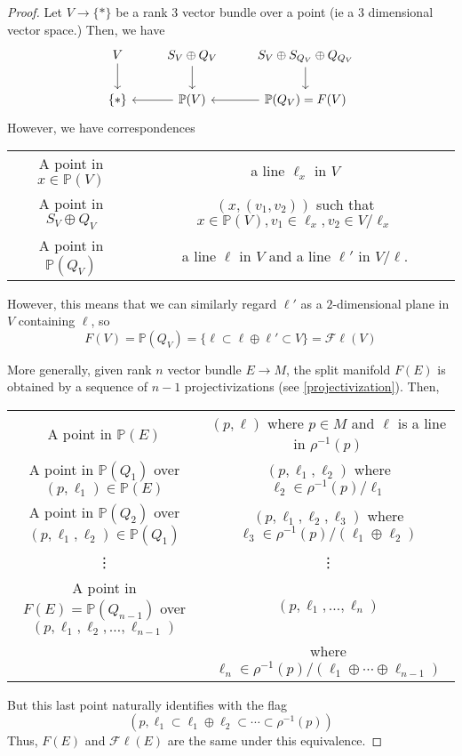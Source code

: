 \documentclass[11pt,leqno,oneside]{amsbook}
\renewcommand{\P}{\mathbb{P}}
\numberwithin{thm}{section}
\newcommand{\Fl}{\mathcal{F\ell}}
\begin{document}
\begin{proof}
  Let \(V \to \{*\}\) be a rank \(3\) vector bundle over a point (ie a
  \(3\) dimensional vector space.) Then, we have \[
    \begin{tikzcd}
      V \ar[d]& S_V \oplus Q_V \ar[d]& S_V \oplus S_{Q_V} \oplus Q_{Q_V} \ar[d]\\
      \{*\} &\ar[l] \P(V) & \ar[l] \P(Q_V) = F(V)
    \end{tikzcd}
  \]
  However, we have correspondences
  \begin{center}
    \begin{tabular}{c|c}
      A point in \(x \in \P(V)\)&  a line \(\ell_x\) in \(V\)\\
      A point in \(S_V \oplus Q_V\) & \((x,(v_1,v_2))\) such that \(
      x \in \P(V), v_1 \in \ell_x, v_2 \in V / \ell_x\) \\
      A point in \(\P(Q_V)\)& a line \(\ell\) in \(V\)
      and a line \(\ell'\) in \(V/\ell\).
    \end{tabular}
  \end{center}
  However, this means that we can similarly regard \(\ell'\) as a
  \(2\)-dimensional plane in \(V\) containing \(\ell\), so \[
    F(V) = \P(Q_V) = \{\ell \subset \ell \oplus \ell' \subset V\} = \Fl(V)
  \]

  More generally, given rank \(n\) vector bundle \(E \to M\), the
  split manifold \(F(E)\) is obtained by a sequence of \(n-1\)
  projectivizations (see \ref{projectivization}). Then,\\
  \begin{center}
    \noindent\begin{tabular}{@{}c|c}
      A point in \(\P(E)\)
      & \((p,\ell)\) where \(p \in M\) and
        \(\ell\) is a line in \(\rho^{-1}(p)\)\\
      A point in \(\P(Q_1)\) over \((p,\ell_1) \in \P(E)\)
      & \((p,\ell_1,\ell_2)\) where \(\ell_2 \in \rho^{-1}(p) /
        \ell_1\)\\
      A point in \(\P(Q_2)\) over \((p,\ell_1,\ell_2) \in \P(Q_1)\)
      & \((p,\ell_1,\ell_2,\ell_3)\) where \(\ell_3 \in \rho^{-1}(p) /
        (\ell_1 \oplus \ell_2)\) \\
      \vdots & \vdots \\
      A point in \(F(E) = \P(Q_{n-1})\) over \((p,\ell_1, \ell_2,
      \ldots, \ell_{n-1})\)
               & \((p, \ell_1, \ldots, \ell_n)\) \\
               & where \(\ell_n \in
        \rho^{-1}(p)/(\ell_1 \oplus \cdots \oplus \ell_{n-1})\)
    \end{tabular}
  \end{center}
  But this last point naturally identifies with the flag \[
    (p, \ell_1 \subset \ell_1 \oplus \ell_2 \subset \cdots \subset \rho^{-1}(p))
  \]
  Thus, \(F(E)\) and \(\Fl(E)\) are the same under this equivalence.
\end{proof}
\end{document}
